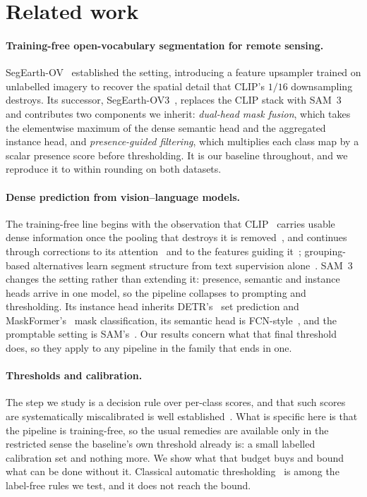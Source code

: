 \documentclass[10pt,a4paper]{article}                        %
\begin{document}
\section{Related work}
\label{sec:related}

\paragraph{Training-free open-vocabulary segmentation for remote sensing.}
SegEarth-OV~\cite{segearthov} established the setting, introducing a feature
upsampler trained on unlabelled imagery to recover the spatial detail that
CLIP's $1/16$ downsampling destroys. Its successor,
SegEarth-OV3~\cite{segearthov3}, replaces the CLIP stack with SAM~3~\cite{sam3}
and contributes two components we inherit: \emph{dual-head mask fusion}, which
takes the elementwise maximum of the dense semantic head and the aggregated
instance head, and \emph{presence-guided filtering}, which multiplies each class
map by a scalar presence score before thresholding. It is our baseline
throughout, and we reproduce it to within rounding on both datasets.

\paragraph{Dense prediction from vision--language models.}
The training-free line begins with the observation that CLIP~\cite{clip} carries
usable dense information once the pooling that destroys it is
removed~\cite{maskclip}, and continues through corrections to its
attention~\cite{sclip,clearclip} and to the features guiding it~\cite{proxyclip};
grouping-based alternatives learn segment structure from text supervision
alone~\cite{groupvit}. SAM~3 changes the setting rather than extending it:
presence, semantic and instance heads arrive in one model, so the pipeline
collapses to prompting and thresholding. Its instance head inherits
DETR's~\cite{detr} set prediction and MaskFormer's~\cite{maskformer} mask
classification, its semantic head is FCN-style~\cite{fcn}, and the promptable
setting is SAM's~\cite{sam}. Our results concern what that final threshold does,
so they apply to any pipeline in the family that ends in one.

\paragraph{Thresholds and calibration.}
The step we study is a decision rule over per-class scores, and that such scores
are systematically miscalibrated is well established~\cite{calibration}. What is
specific here is that the pipeline is training-free, so the usual remedies are
available only in the restricted sense the baseline's own threshold already is: a
small labelled calibration set and nothing more. We show what that budget buys
and bound what can be done without it. Classical automatic
thresholding~\cite{otsu} is among the label-free rules we test, and it does not
reach the bound.
\end{document}
